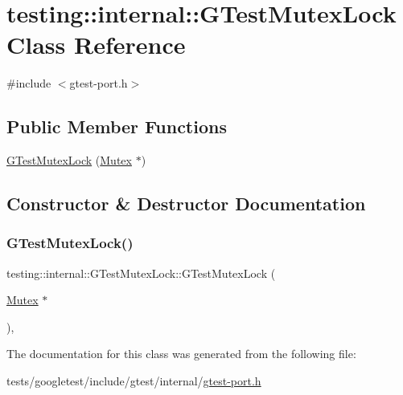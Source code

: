 \hypertarget{classtesting_1_1internal_1_1GTestMutexLock}{}\section{testing\+:\+:internal\+:\+:G\+Test\+Mutex\+Lock Class Reference}
\label{classtesting_1_1internal_1_1GTestMutexLock}


{\ttfamily \#include $<$gtest-\/port.\+h$>$}

\subsection*{Public Member Functions}
\begin{DoxyCompactItemize}
\item 
\hyperlink{classtesting_1_1internal_1_1GTestMutexLock_a77e3cba326d5356b4a1dea3790559c26}{G\+Test\+Mutex\+Lock} (\hyperlink{classtesting_1_1internal_1_1Mutex}{Mutex} $\ast$)
\end{DoxyCompactItemize}


\subsection{Constructor \& Destructor Documentation}
\mbox{\label{classtesting_1_1internal_1_1GTestMutexLock_a77e3cba326d5356b4a1dea3790559c26}} 
\subsubsection{\texorpdfstring{G\+Test\+Mutex\+Lock()}{GTestMutexLock()}}
{\footnotesize\ttfamily testing\+::internal\+::\+G\+Test\+Mutex\+Lock\+::\+G\+Test\+Mutex\+Lock (\begin{DoxyParamCaption}\item[{\hyperlink{classtesting_1_1internal_1_1Mutex}{Mutex} $\ast$}]{ }\end{DoxyParamCaption})\hspace{0.3cm}{\ttfamily [inline]}, {\ttfamily [explicit]}}



The documentation for this class was generated from the following file\+:\begin{DoxyCompactItemize}
\item 
tests/googletest/include/gtest/internal/\hyperlink{gtest-port_8h}{gtest-\/port.\+h}\end{DoxyCompactItemize}
